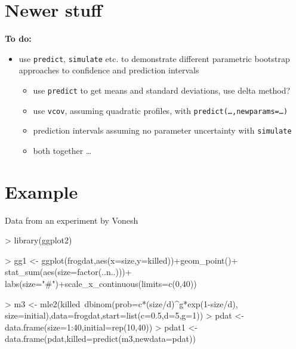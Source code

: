 \documentclass{article}
\newcommand{\code}[1]{{\tt #1}}
\begin{document}
\section{Newer stuff}

\textbf{To do:}
\begin{itemize}
  \item{use \code{predict}, \code{simulate} etc.
    to demonstrate different parametric bootstrap approaches
    to confidence and prediction intervals
    \begin{itemize}
      \item use \code{predict} to get means and standard
        deviations, use delta method?
      \item use \code{vcov}, assuming quadratic profiles,
        with \code{predict(\ldots,newparams=\ldots)}
      \item prediction intervals assuming no parameter uncertainty
        with \code{simulate}
      \item both together \ldots
      \end{itemize}
    }
  \end{itemize}

\section{Example}

Data from an experiment by Vonesh \citep{VoneshBolker2005}
\begin{Schunk}
\end{Schunk}

\begin{Schunk}
\begin{Sinput}
> library(ggplot2)
\end{Sinput}
\end{Schunk}

\begin{Schunk}
\begin{Sinput}
> gg1 <- ggplot(frogdat,aes(x=size,y=killed))+geom_point()+
       stat_sum(aes(size=factor(..n..)))+
       labs(size="#")+scale_x_continuous(limits=c(0,40))
\end{Sinput}
\end{Schunk}

\begin{Schunk}
\begin{Sinput}
> m3 <- mle2(killed~dbinom(prob=c*(size/d)^g*exp(1-size/d),
   size=initial),data=frogdat,start=list(c=0.5,d=5,g=1))
> pdat <- data.frame(size=1:40,initial=rep(10,40))
> pdat1 <- data.frame(pdat,killed=predict(m3,newdata=pdat))
\end{Sinput}
\end{Schunk}
\end{document}
